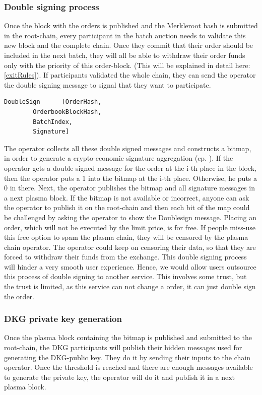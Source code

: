 \documentclass[11pt,parskip=full]{scrartcl}%
\begin{document}
\subsubsection{Double signing process}
Once the block with the orders is published and the Merkleroot hash is submitted in the root-chain, every participant in the batch auction needs to validate this new block and the complete chain. Once they commit that their order should be included in the next batch, they will all be able to withdraw their order funds only with the priority of this order-block. (This will be explained in detail here: \ref{exitRules}).
If participants validated the whole chain, they can send the operator the double signing message to signal that they want to participate.
\begin{lstlisting}
DoubleSign      [OrderHash,
		OrderbookBlockHash,
		BatchIndex,
		Signature]
\end{lstlisting}
The operator collects all these double signed messages and constructs a bitmap, in order to generate a crypto-economic signature aggregation (cp. \cite{sig}). If the operator gets a double signed message for the order at the i-th place in the block, then the operator puts a 1 into the bitmap at the i-th place. Otherwise, he puts a 0 in there. Next, the operator publishes the bitmap and all signature messages in a next plasma block. If the bitmap is not available or incorrect, anyone can ask the operator to publish it on the root-chain and then each bit of the map could be challenged by asking the operator to show the Doublesign message. \newline
Placing an order, which will not be executed by the limit price, is for free. If people miss-use this free option to spam the plasma chain, they will be censored by the plasma chain operator. The operator could keep on censoring their data, so that they are forced to withdraw their funds from the exchange.\newline
This double signing process will hinder a very smooth user experience. Hence, we would allow users outsource this process of double signing to another service. This involves some trust, but the trust is limited, as this service can not change a order, it can just double sign the order. 

\subsubsection{DKG private key generation}
Once the plasma block containing the bitmap is published and submitted to the root-chain, the DKG participants will publish their hidden messages used for generating the DKG-public key. They do it by sending their inputs to the chain operator. Once the threshold is reached and there are enough messages available to generate the private key, the operator will do it and publish it in a next plasma block.
\end{document}
